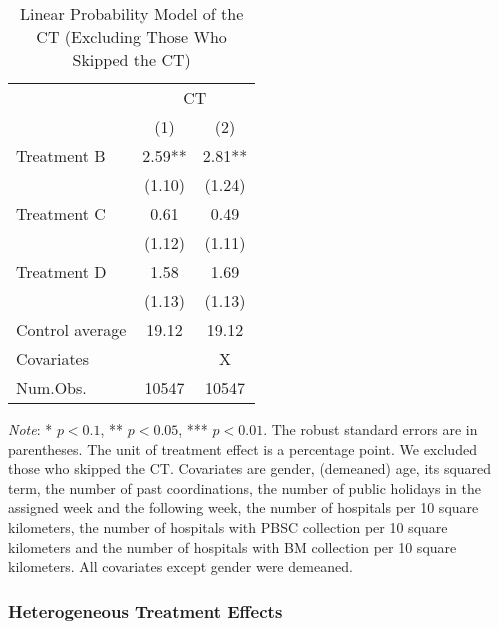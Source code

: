 \documentclass[12pt, a4paper]{article}
\begin{document}
\begin{table}[H]

\caption{\label{tab:lm-test-noskip}Linear Probability Model of the CT (Excluding Those Who Skipped the CT)}
\centering
\fontsize{8}{10}\selectfont
\begin{threeparttable}
\begin{tabular}[t]{lcc}
\toprule
\multicolumn{1}{c}{ } & \multicolumn{2}{c}{CT} \\
\cmidrule(l{3pt}r{3pt}){2-3}
  & (1) & (2)\\
\midrule
Treatment B & \num{2.59}** & \num{2.81}**\\
 & (\num{1.10}) & (\num{1.24})\\
Treatment C & \num{0.61} & \num{0.49}\\
 & (\num{1.12}) & (\num{1.11})\\
Treatment D & \num{1.58} & \num{1.69}\\
 & (\num{1.13}) & (\num{1.13})\\
\midrule
Control average & 19.12 & 19.12\\
Covariates &  & X\\
Num.Obs. & \num{10547} & \num{10547}\\
\bottomrule
\end{tabular}
\begin{tablenotes}
\item \emph{Note}: * $p < 0.1$, ** $p < 0.05$, *** $p < 0.01$. The robust standard errors are in parentheses. The unit of treatment effect is a percentage point. We excluded those who skipped the CT. Covariates are gender, (demeaned) age, its squared term, the number of past coordinations, the number of public holidays in the assigned week and the following week, the number of hospitals per 10 square kilometers, the number of hospitals with PBSC collection per 10 square kilometers and the number of hospitals with BM collection per 10 square kilometers. All covariates except gender were demeaned.
\end{tablenotes}
\end{threeparttable}
\end{table}

\hypertarget{heterogeneous-treatment-effects}{%
\subsubsection{Heterogeneous Treatment Effects}\label{heterogeneous-treatment-effects}}
\end{document}

